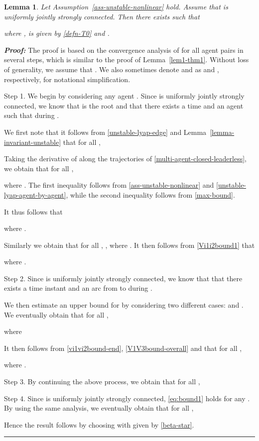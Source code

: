\documentclass[a4paper, 11pt]{article}
\newtheorem{lemma}{Lemma}
\newenvironment{IEEEproof}[1][\bf Proof]{\smallskip\par\noindent\textit{#1: }}{\hspace*{\fill} \rule{6pt}{6pt}\smallskip}
\begin{document}
\begin{lemma}\label{lem-thm-unstable}
Let Assumption~\ref{ass-unstable-nonlinear} hold. Assume that  is uniformly jointly strongly connected. Then there exists  such that

where ,  is given by \eqref{defn-T0} and .
\end{lemma}

\begin{IEEEproof}
The proof is based on the convergence analysis of  for all agent pairs 
in several steps, which is similar to the proof of Lemma~\ref{lem1-thm1}. Without loss of generality, we assume that . We also sometimes denote  and  as  and , respectively, for notational simplification.

\noindent Step 1. We begin by considering any agent . Since  is uniformly jointly strongly connected, we know that
 is the root and that there exists a time  and an agent  such that  during .

We first note that it follows from \eqref{unstable-lyap-edge} and Lemma~\ref{lemma-invariant-unstable} that for all ,


Taking the derivative of  along the trajectories of \eqref{multi-agent-closed-leaderless}, we obtain that for all ,

where . The first inequality follows from \eqref{ass-unstable-nonlinear} and \eqref{unstable-lyap-agent-by-agent}, while the second inequality follows from \eqref{max-bound}.

It thus follows that

where .

Similarly we obtain that for all , , where . It then follows from \eqref{Vi1i2bound1} that

where .

\vspace*{2mm}

\noindent Step 2.   Since  is uniformly jointly strongly connected, we know that
that there exists a time instant  and an arc from  to
 during .

We then estimate an upper bound for  by considering two different cases:  and .
We eventually obtain that for all ,

where

It then follows from \eqref{vi1vi2bound-end}, \eqref{V1V3bound-overall}
and  that for all ,

where .

\vspace*{2mm}

\noindent Step 3. By continuing the above process, we obtain that for all ,


\vspace*{2mm}

\noindent Step 4. Since  is uniformly jointly strongly connected, \eqref{eq:bound1} holds for any . By using the same analysis, we eventually obtain that for all ,

Hence the result follows by choosing  with  given by \eqref{beta-star}.
\end{IEEEproof}
\end{document}
